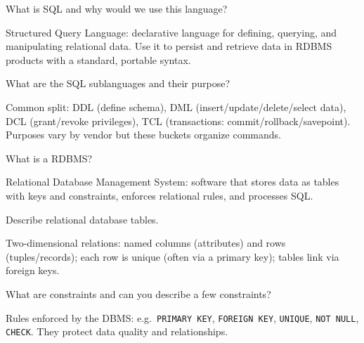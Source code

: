 



\question[4]
What is SQL and why would we use this language?
\makeemptybox{1.25in}
\begin{solution}
  Structured Query Language: declarative language for defining, querying, and manipulating relational data. Use it to persist and retrieve data in RDBMS products with a standard, portable syntax.
\end{solution}

\question[4]
What are the SQL sublanguages and their purpose?
\makeemptybox{1.45in}
\begin{solution}
  Common split: DDL (define schema), DML (insert/update/delete/select data), DCL (grant/revoke privileges), TCL (transactions: commit/rollback/savepoint). Purposes vary by vendor but these buckets organize commands.
\end{solution}

\question[4]
What is a RDBMS?
\makeemptybox{1.05in}
\begin{solution}
  Relational Database Management System: software that stores data as tables with keys and constraints, enforces relational rules, and processes SQL.
\end{solution}

\question[4]
Describe relational database tables.
\makeemptybox{1.25in}
\begin{solution}
  Two-dimensional relations: named columns (attributes) and rows (tuples/records); each row is unique (often via a primary key); tables link via foreign keys.
\end{solution}

\question[4]
What are constraints and can you describe a few constraints?
\makeemptybox{1.45in}
\begin{solution}
  Rules enforced by the DBMS: e.g.\ \texttt{PRIMARY KEY}, \texttt{FOREIGN KEY}, \texttt{UNIQUE}, \texttt{NOT NULL}, \texttt{CHECK}. They protect data quality and relationships.
\end{solution}


